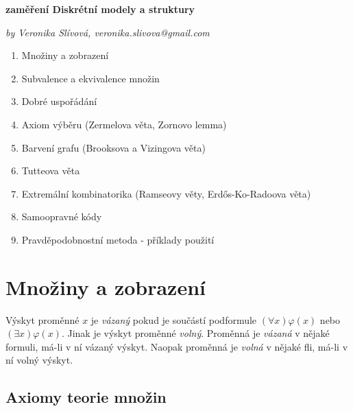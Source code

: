 \documentclass[a4paper,10pt,titlepage]{article} \usepackage[utf8]{inputenc}
\begin{document}
 \pagestyle{empty}
\begin{center}
\textbf{zaměření Diskrétní modely a struktury}

\textit{by Veronika Slívová, veronika.slivova@gmail.com}
\end{center}
\medskip

{}

\begin{enumerate}
\item Množiny a zobrazení
\item Subvalence a ekvivalence množin
\item Dobré uspořádání
\item Axiom výběru (Zermelova věta, Zornovo lemma)
\item Barvení grafu (Brooksova a Vizingova věta)
\item Tutteova věta
\item Extremální kombinatorika (Ramseovy věty, Erd\H{o}s-Ko-Radoova věta)
\item Samoopravné kódy
\item Pravděpodobnostní metoda - příklady použití
\end{enumerate}


\medskip

\section{Množiny a zobrazení}

Výskyt proměnné $x$ je \textit{vázaný} pokud je součástí podformule $(\forall x) \varphi(x)$ nebo $(\exists x) \varphi(x)$.
Jinak je výskyt proměnné \textit{volný}. 
Proměnná je \textit{vázaná} v nějaké formuli, má-li v ní vázaný výskyt.
Naopak proměnná je \textit{volná} v nějaké fli, má-li v ní volný výskyt.

\subsection{Axiomy teorie množin}
\end{document}
